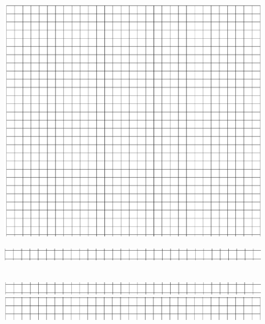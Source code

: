 \documentclass[10pt]{article}
\begin{document}
\includegraphics[max width=\textwidth, center]{2024_11_21_5229b9d0453456f1828dg-12(3)}\\
\(\qquad\)\\
\includegraphics[max width=\textwidth, center]{2024_11_21_5229b9d0453456f1828dg-12(1)}\\
\(\qquad\)\\
\(\qquad\)\\
\includegraphics[max width=\textwidth, center]{2024_11_21_5229b9d0453456f1828dg-12}\\
\includegraphics[max width=\textwidth, center]{2024_11_21_5229b9d0453456f1828dg-12(2)}
\end{document}
